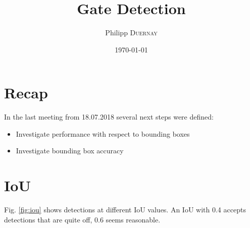 \documentclass{article}
\title{Gate Detection} %
\author{Philipp \textsc{Duernay}} %
\date{\today} %
\begin{document}
\maketitle


\section{Recap}
In the last meeting from 18.07.2018 several next steps were defined:
\begin{itemize}
	\item Investigate performance with respect to bounding boxes
	\item Investigate bounding box accuracy
\end{itemize}

\section{IoU}

Fig. \ref{fig:iou} shows detections at different IoU values. An IoU with 0.4 accepts detections that are quite off, 0.6 seems reasonable.
\end{document}
